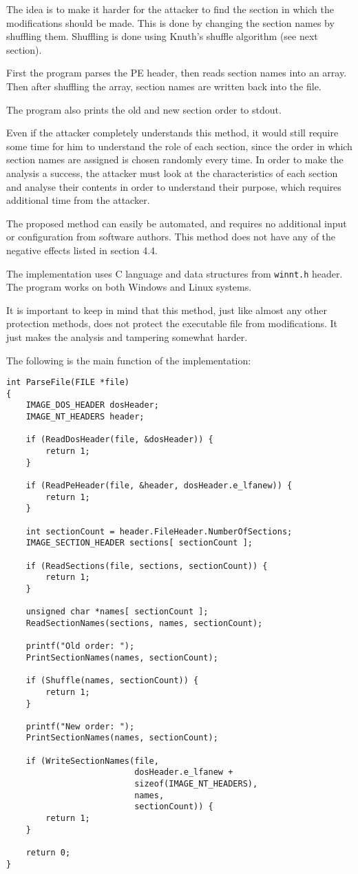 \documentclass[a4paper,12pt]{article}
\begin{document}
The idea is to make it harder for the attacker to find the section in which
the modifications should be made. This is done by changing the section names
by shuffling them. Shuffling is done using Knuth's shuffle algorithm (see
next section).

First the program parses the PE header, then reads section names into an
array. Then after shuffling the array, section names are written back
into the file.

The program also prints the old and new section order to stdout.

Even if the attacker completely understands this method, it would still
require some time for him to understand the role of each section, since the
order in which section names are assigned is chosen randomly every time.
In order to make the analysis a success, the attacker must look at the
characteristics of each section and analyse their contents in order to
understand their purpose, which requires additional time from the attacker.

The proposed method can easily be automated, and requires no additional
input or configuration from software authors. This method does not have any
of the negative effects listed in section 4.4.

The implementation uses C language and data structures from \texttt{winnt.h}
header. The program works on both Windows and Linux systems.

It is important to keep in mind that this method, just like almost any other
protection methods, does not protect the executable file from modifications.
It just makes the analysis and tampering somewhat harder.

The following is the main function of the implementation:

\begin{verbatim}
int ParseFile(FILE *file)
{
    IMAGE_DOS_HEADER dosHeader;
    IMAGE_NT_HEADERS header;

    if (ReadDosHeader(file, &dosHeader)) {
        return 1;
    }

    if (ReadPeHeader(file, &header, dosHeader.e_lfanew)) {
        return 1;
    }

    int sectionCount = header.FileHeader.NumberOfSections;
    IMAGE_SECTION_HEADER sections[ sectionCount ];

    if (ReadSections(file, sections, sectionCount)) {
        return 1;
    }

    unsigned char *names[ sectionCount ];
    ReadSectionNames(sections, names, sectionCount);

    printf("Old order: ");
    PrintSectionNames(names, sectionCount);

    if (Shuffle(names, sectionCount)) {
        return 1;
    }

    printf("New order: ");
    PrintSectionNames(names, sectionCount);

    if (WriteSectionNames(file,
                          dosHeader.e_lfanew +
                          sizeof(IMAGE_NT_HEADERS),
                          names,
                          sectionCount)) {
        return 1;
    }

    return 0;
}
\end{verbatim}
\end{document}
